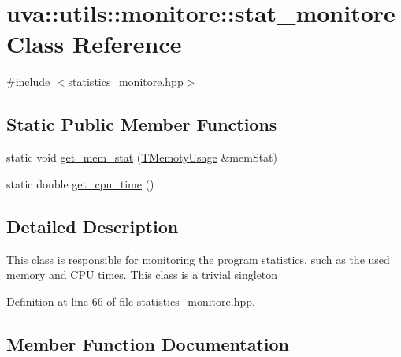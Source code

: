 \hypertarget{classuva_1_1utils_1_1monitore_1_1stat__monitore}{}\section{uva\+:\+:utils\+:\+:monitore\+:\+:stat\+\_\+monitore Class Reference}
\label{classuva_1_1utils_1_1monitore_1_1stat__monitore}


{\ttfamily \#include $<$statistics\+\_\+monitore.\+hpp$>$}

\subsection*{Static Public Member Functions}
\begin{DoxyCompactItemize}
\item 
static void \hyperlink{classuva_1_1utils_1_1monitore_1_1stat__monitore_adca5538abe24629019243282d14a6c9f}{get\+\_\+mem\+\_\+stat} (\hyperlink{namespaceuva_1_1utils_1_1monitore_aa3ee5e440e3d902d9b6d26a24aa95c39}{T\+Memoty\+Usage} \&mem\+Stat)
\item 
static double \hyperlink{classuva_1_1utils_1_1monitore_1_1stat__monitore_ad05c1ec1b7a620a8541a3696c06bba8f}{get\+\_\+cpu\+\_\+time} ()
\end{DoxyCompactItemize}


\subsection{Detailed Description}
This class is responsible for monitoring the program statistics, such as the used memory and C\+P\+U times. This class is a trivial singleton 

Definition at line 66 of file statistics\+\_\+monitore.\+hpp.



\subsection{Member Function Documentation}
\hypertarget{classuva_1_1utils_1_1monitore_1_1stat__monitore_ad05c1ec1b7a620a8541a3696c06bba8f}{}
